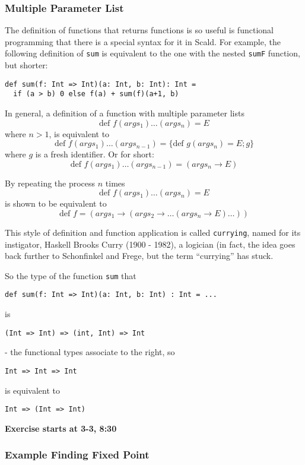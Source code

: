 \documentclass{scrartcl}
\newcommand{\term}[1]{\verb~#1~} %
\begin{document}
\subsubsection{Multiple Parameter List}
\label{sec:MultipleParameterList}

The definition of functions that returns functions is so useful is functional
programming that there is a special syntax for it in Scald. For example, the
following definition of \lstinline|sum| is equivalent to the one with the nested
\lstinline|sumF| function, but shorter:
\begin{lstlisting}
def sum(f: Int => Int)(a: Int, b: Int): Int =
  if (a > b) 0 else f(a) + sum(f)(a+1, b)
\end{lstlisting}

In general, a definition of a function with multiple parameter lists
$$\text{def }f(args_1)\dots(args_n) = E$$
where $n > 1$, is equivalent to
$$\text{def }f(args_1)\dots(args_{n-1}) = \{\text{def } g(args_n) = E; g\}$$
where $g$ is a fresh identifier. Or for short:
$$\text{def } f(args_1)\dots(args_{n-1}) = (args_n \to E)$$

By repeating the process $n$ times
$$\text{def } f(args_1)\dots(args_n) = E$$
is shown to be equivalent to
$$\text{def } f = (args_1 \to (args_2 \to \dots(args_n \to E) \dots )) $$

This style of definition and function application is called \term{currying},
named for its instigator, Haskell Brooks Curry (1900 - 1982), a logician (in
fact, the idea goes back further to Schonfinkel and Frege, but the term
``currying'' has stuck.

So the type of the function \lstinline|sum| that
\begin{lstlisting}
def sum(f: Int => Int)(a: Int, b: Int) : Int = ...
\end{lstlisting}
is
\begin{lstlisting}
(Int => Int) => (int, Int) => Int
\end{lstlisting}
- the functional types associate to the right, so
\begin{lstlisting}
Int => Int => Int
\end{lstlisting}
is equivalent to
\begin{lstlisting}
Int => (Int => Int)
\end{lstlisting}
{\bf Exercise starts at 3-3, 8:30 }

\subsubsection{Example Finding Fixed Point}
\label{sec:ExampleFindingFixedPoint}
\end{document}
